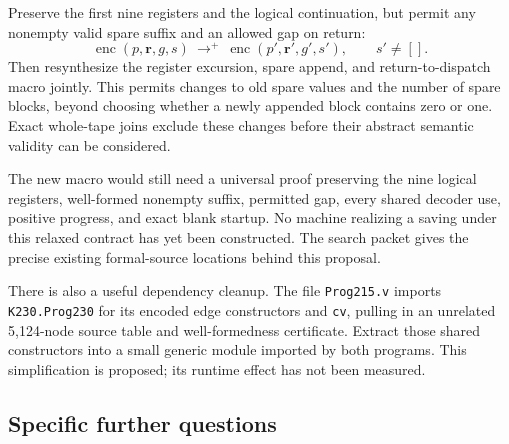 \documentclass[11pt]{article}
\theoremstyle{definition}\newtheorem{definition}[theorem]{Definition}
\begin{document}
Preserve the first nine registers and the logical continuation, but permit
any nonempty valid spare suffix and an allowed gap on return:
\[
 \operatorname{enc}(p,\mathbf r,g,s)
 \ \longrightarrow^{+}\ 
 \operatorname{enc}(p',\mathbf r',g',s'),\qquad s'\ne[].
\]
Then resynthesize the register excursion, spare append, and return-to-dispatch
macro jointly. This permits changes to old spare values and the number of
spare blocks, beyond choosing whether a newly appended block contains zero or
one. Exact whole-tape joins exclude these changes before their abstract
semantic validity can be considered.

The new macro would still need a universal proof preserving the nine logical
registers, well-formed nonempty suffix, permitted gap, every shared decoder
use, positive progress, and exact blank startup. No machine realizing a saving
under this relaxed contract has yet been constructed. The search packet gives
the precise existing formal-source locations behind this proposal.

There is also a useful dependency cleanup. The file \texttt{Prog215.v}
imports \texttt{K230.Prog230} for its encoded
edge constructors and \texttt{cv}, pulling in an unrelated 5,124-node source
table and well-formedness certificate. Extract those shared constructors into
a small generic module imported by both programs. This simplification is
proposed; its runtime effect has not been measured.

\subsection{Specific further questions}
\end{document}
